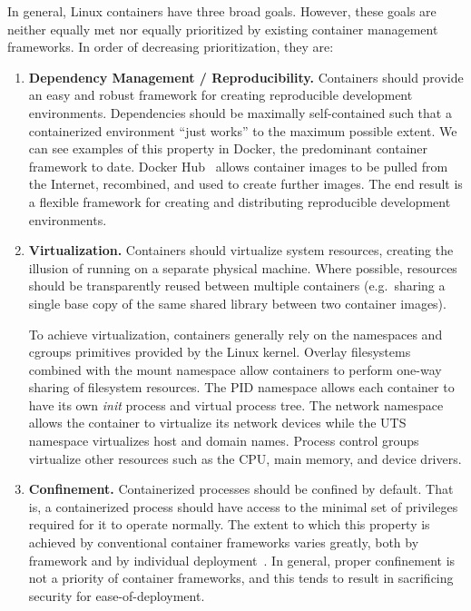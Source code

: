 In general, Linux containers have three broad goals. However, these goals are neither
equally met nor equally prioritized by existing container management frameworks. In order
of decreasing prioritization, they are:
\begin{enumerate}[font=\bfseries]
  \item \textbf{Dependency Management / Reproducibility.}
    Containers should provide an easy and robust framework for creating reproducible
    development environments. Dependencies should be maximally self-contained such that
    a containerized environment \enquote{just works} to the maximum possible extent. We
    can see examples of this property in Docker, the predominant container framework to
    date. Docker Hub~\cite{docker_hub} allows container images to be pulled from the
    Internet, recombined, and used to create further images. The end result is a flexible
    framework for creating and distributing reproducible development environments.

  \item \textbf{Virtualization.}
    Containers should virtualize system resources, creating the illusion of running on
    a separate physical machine. Where possible, resources should be transparently reused
    between multiple containers (e.g.~sharing a single base copy of the same shared
    library between two container images).

    To achieve virtualization, containers generally rely on the namespaces and cgroups
    primitives provided by the Linux kernel.  Overlay filesystems~\cite{overlayfs}
    combined with the mount namespace allow containers to perform one-way sharing of
    filesystem resources. The PID namespace allows each container to have its own
    \textit{init} process and virtual process tree.  The network namespace allows the
    container to virtualize its network devices while the UTS namespace virtualizes host
    and domain names. Process control groups virtualize other resources such as the CPU,
    main memory, and device drivers.

  \item \textbf{Confinement.}
    Containerized processes should be confined by default. That is, a containerized
    process should have access to the minimal set of privileges required for it to operate
    normally. The extent to which this property is achieved by conventional container
    frameworks varies greatly, both by framework and by individual
    deployment~\cite{sultan2019_container_security, lin2018_container_security,
    bui2015_docker_analysis}. In general, proper confinement is not a priority of
    container frameworks, and this tends to result in sacrificing security for
    ease-of-deployment.
\end{enumerate}

